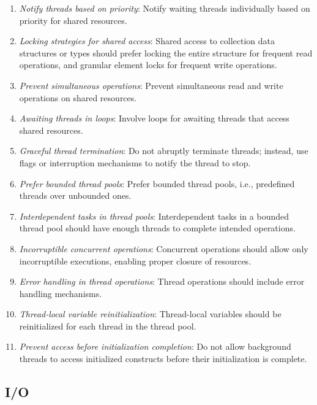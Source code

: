 \documentclass[9pt]{IEEEtran} %
\begin{document}
\begin{enumerate}
  \item \textit{Notify threads based on priority}: Notify waiting threads individually based on priority for shared resources.
  \item \textit{Locking strategies for shared access}: Shared access to collection data structures or types should prefer locking the entire structure for frequent read operations, and granular element locks for frequent write operations.
  \item \textit{Prevent simultaneous operations}: Prevent simultaneous read and write operations on shared resources.
  \item \textit{Awaiting threads in loops}: Involve loops for awaiting threads that access shared resources.
  \item \textit{Graceful thread termination}: Do not abruptly terminate threads; instead, use flags or interruption mechanisms to notify the thread to stop.
  \item \textit{Prefer bounded thread pools}: Prefer bounded thread pools, i.e., predefined threads over unbounded ones.
  \item \textit{Interdependent tasks in thread pools}: Interdependent tasks in a bounded thread pool should have enough threads to complete intended operations.
  \item \textit{Incorruptible concurrent operations}: Concurrent operations should allow only incorruptible executions, enabling proper closure of resources.
  \item \textit{Error handling in thread operations}: Thread operations should include error handling mechanisms.
  \item \textit{Thread-local variable reinitialization}: Thread-local variables should be reinitialized for each thread in the thread pool.
  \item \textit{Prevent access before initialization completion}: Do not allow background threads to access initialized constructs before their initialization is complete.
\end{enumerate}

\subsection{I/O}
\label{ESSIO}
\end{document}
